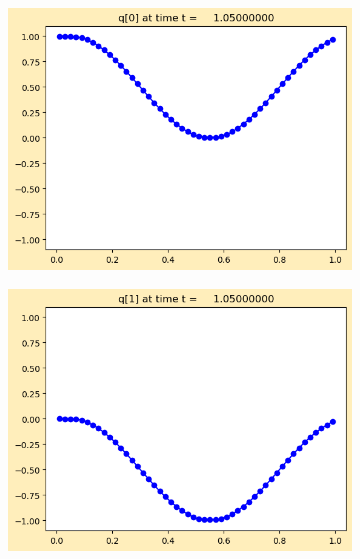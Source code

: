 \documentclass{article}
\begin{document}
\begin{figure}[H]
	\centering
	\begin{subfigure}{0.495\linewidth}
		\centering
		\includegraphics[width=\linewidth]{standing/_plots/frame0021fig0.png}
	\end{subfigure}
	\begin{subfigure}{0.495\linewidth}
		\centering
		\includegraphics[width=\linewidth]{standing/_plots/frame0021fig1.png}
	\end{subfigure}
	\centering
	\begin{subfigure}{0.495\linewidth}
		\centering

\end{subfigure}
\end{figure}
\end{document}

